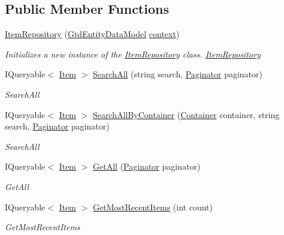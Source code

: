 \subsection*{Public Member Functions}
\begin{DoxyCompactItemize}
\item 
\mbox{\hyperlink{class_gtd_app_1_1_repository_1_1_item_repository_ad85f0deb2de0b43783988f9491e42945}{Item\+Repository}} (\mbox{\hyperlink{class_gtd_app_1_1_data_1_1_gtd_entity_data_model}{Gtd\+Entity\+Data\+Model}} \mbox{\hyperlink{class_gtd_app_1_1_repository_1_1_repository_a693057a1b8acd4c3778c183440feed41}{context}})
\begin{DoxyCompactList}\small\item\em Initializes a new instance of the \mbox{\hyperlink{class_gtd_app_1_1_repository_1_1_item_repository}{Item\+Repository}} class. \mbox{\hyperlink{class_gtd_app_1_1_repository_1_1_item_repository}{Item\+Repository}} \end{DoxyCompactList}\item 
I\+Queryable$<$ \mbox{\hyperlink{class_gtd_app_1_1_data_1_1_item}{Item}} $>$ \mbox{\hyperlink{class_gtd_app_1_1_repository_1_1_item_repository_a9ec0b199ae1cd0fbb1d498c0496823b7}{Search\+All}} (string search, \mbox{\hyperlink{class_gtd_app_1_1_repository_1_1_paginator}{Paginator}} paginator)
\begin{DoxyCompactList}\small\item\em Search\+All \end{DoxyCompactList}\item 
I\+Queryable$<$ \mbox{\hyperlink{class_gtd_app_1_1_data_1_1_item}{Item}} $>$ \mbox{\hyperlink{class_gtd_app_1_1_repository_1_1_item_repository_a304576bc3ab1770c40e5caa41ebbf218}{Search\+All\+By\+Container}} (\mbox{\hyperlink{class_gtd_app_1_1_data_1_1_container}{Container}} container, string search, \mbox{\hyperlink{class_gtd_app_1_1_repository_1_1_paginator}{Paginator}} paginator)
\begin{DoxyCompactList}\small\item\em Search\+All \end{DoxyCompactList}\item 
I\+Queryable$<$ \mbox{\hyperlink{class_gtd_app_1_1_data_1_1_item}{Item}} $>$ \mbox{\hyperlink{class_gtd_app_1_1_repository_1_1_item_repository_a5238d94f8e5449fb298b2fa9888b4247}{Get\+All}} (\mbox{\hyperlink{class_gtd_app_1_1_repository_1_1_paginator}{Paginator}} paginator)
\begin{DoxyCompactList}\small\item\em Get\+All \end{DoxyCompactList}\item 
I\+Queryable$<$ \mbox{\hyperlink{class_gtd_app_1_1_data_1_1_item}{Item}} $>$ \mbox{\hyperlink{class_gtd_app_1_1_repository_1_1_item_repository_a321f8eb1347fa0543d08f3e1b2908d09}{Get\+Most\+Recent\+Items}} (int count)
\begin{DoxyCompactList}\small\item\em Get\+Most\+Recent\+Items \end{DoxyCompactList}\end{DoxyCompactItemize}
